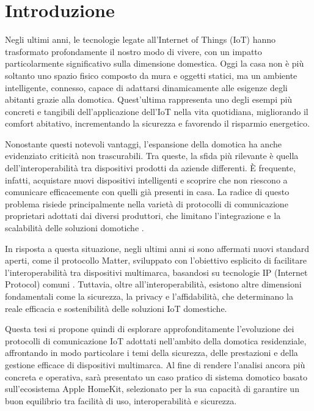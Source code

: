 
\chapter{Introduzione}
Negli ultimi anni, le tecnologie legate all'Internet of Things (IoT) hanno trasformato profondamente il nostro modo di vivere, con un impatto particolarmente significativo sulla dimensione domestica. Oggi la casa non è più soltanto uno spazio fisico composto da mura e oggetti statici, ma un ambiente intelligente, connesso, capace di adattarsi dinamicamente alle esigenze degli abitanti grazie alla domotica. Quest'ultima rappresenta uno degli esempi più concreti e tangibili dell'applicazione dell'IoT nella vita quotidiana, migliorando il comfort abitativo, incrementando la sicurezza e favorendo il risparmio energetico.

\vspace{0.5cm}
Nonostante questi notevoli vantaggi, l'espansione della domotica ha anche evidenziato criticità non trascurabili. Tra queste, la sfida più rilevante è quella dell'interoperabilità tra dispositivi prodotti da aziende differenti. È frequente, infatti, acquistare nuovi dispositivi intelligenti e scoprire che non riescono a comunicare efficacemente con quelli già presenti in casa. La radice di questo problema risiede principalmente nella varietà di protocolli di comunicazione proprietari adottati dai diversi produttori, che limitano l'integrazione e la scalabilità delle soluzioni domotiche \parencite{matterAlliance}.

\vspace{0.5cm}
In risposta a questa situazione, negli ultimi anni si sono affermati nuovi standard aperti, come il protocollo Matter, sviluppato con l'obiettivo esplicito di facilitare l'interoperabilità tra dispositivi multimarca, basandosi su tecnologie IP (Internet Protocol) comuni \parencite{csaMatter}. Tuttavia, oltre all'interoperabilità, esistono altre dimensioni fondamentali come la sicurezza, la privacy e l'affidabilità, che determinano la reale efficacia e sostenibilità delle soluzioni IoT domestiche.

Questa tesi si propone quindi di esplorare approfonditamente l'evoluzione dei protocolli di comunicazione IoT adottati nell'ambito della domotica residenziale, affrontando in modo particolare i temi della sicurezza, delle prestazioni e della gestione efficace di dispositivi multimarca. Al fine di rendere l'analisi ancora più concreta e operativa, sarà presentato un caso pratico di sistema domotico basato sull'ecosistema Apple HomeKit, selezionato per la sua capacità di garantire un buon equilibrio tra facilità di uso, interoperabilità e sicurezza.

